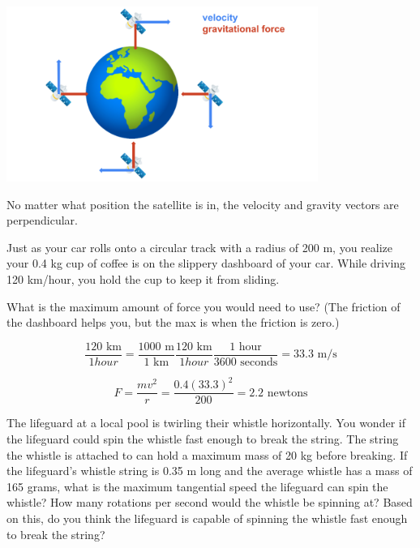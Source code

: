\begin{center}
\includegraphics[width=4in]{satellite.png}
\end{center}

No matter what position the satellite is in, the velocity and gravity vectors are perpendicular. 


\begin{Exercise}[title={Circular Motion}, label=circular]
Just as your car rolls onto a circular track with a radius of 200 m,
you realize your 0.4 kg cup of coffee is on the slippery dashboard of your
car.  While driving 120 km/hour, you hold the cup to keep it from sliding.

What is the maximum amount of force you would need to use? (The friction of
the dashboard helps you, but the max is when the friction is zero.)

\end{Exercise}
\begin{Answer}[ref=circular]
  $$\frac{120 \text{ km}}{1 hour} = \frac{1000 \text{ m}}{1 \text{ km}}\frac{120 \text{ km}}{1 hour} \frac{1 \text{ hour}}{3600 \text{ seconds}}= 33.3 \text{ m/s}$$

  $$F = \frac{m v^2}{r} = \frac {0.4 (33.3)^2}{200} = 2.2 \text{ newtons}$$
\end{Answer}

\begin{Exercise}[title = {Twirling a Whistle}, label = whistle]
The lifeguard at a local pool is twirling their whistle horizontally. You wonder if the lifeguard could spin the whistle fast enough to break the string. The string the whistle is attached to can hold a maximum mass of 20 kg before breaking. If the lifeguard's whistle string is 0.35 m long and the average whistle has a mass of 165 grams, what is the maximum tangential speed the lifeguard can spin the whistle? How many rotations per second would the whistle be spinning at? Based on this, do you think the lifeguard is capable of spinning the whistle fast enough to break the string?
\end{Exercise}

